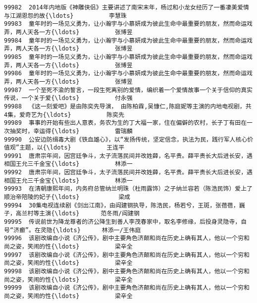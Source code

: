 \documentclass[11pt]{article}
\begin{document}
\begin{Verbatim}[commandchars=\\\{\}]
99982  2014年内地版《神雕侠侣》主要讲述了南宋末年，杨过和小龙女经历了一番凄美爱情与江湖恩怨的故{\ldots}          李慧珠   
99983  童年时的一场见义勇为，让小瀚宇与小慕妍成为彼此生命中最重要的朋友，然而命运戏弄，两人天各一方{\ldots}          张博昱   
99984  童年时的一场见义勇为，让小瀚宇与小慕妍成为彼此生命中最重要的朋友，然而命运戏弄，两人天各一方{\ldots}          张博昱   
99985  童年时的一场见义勇为，让小瀚宇与小慕妍成为彼此生命中最重要的朋友，然而命运戏弄，两人天各一方{\ldots}          张博昱   
99986  童年时的一场见义勇为，让小瀚宇与小慕妍成为彼此生命中最重要的朋友，然而命运戏弄，两人天各一方{\ldots}          张博昱   
99987  一个至死不渝的誓言，一段生死离别的爱情，编织着一个爱情故事一个关于信仰的真实传说，一个关于爱{\ldots}          付永强   
99988  《这一刻爱吧》是由陈奕先导演， 由陈柏霖,吴慷仁,陈庭妮等主演的内地电视剧，共4集，爱奇艺为{\ldots}          陈奕先   
99989  事事的开始有些出人意表，务农为生的丁大福一家，住在偏僻的农村，长子丁有田在一次抽奖时，幸运得{\ldots}          雷瑞麟   
99990  公安边防缉毒大剧《铁血雄心》，以“发扬传统，坚定信念，执法为民，践行军人核心价值观”主题，以{\ldots}          王连平   
99991  唐肃宗年间，因宫廷争斗，太子流落民间并改姓薛，名平贵。薛平贵长大后进长安，遇相国王允三千金宝{\ldots}          林添一   
99992  唐肃宗年间，因宫廷争斗，太子流落民间并改姓薛，名平贵。薛平贵长大后进长安，遇相国王允三千金宝{\ldots}          林添一   
99993  在清朝康熙年间，内务府总管纳兰明珠（杜雨露饰）之子纳兰容若（陈浩民饰）爱上了顺治帝陪陵的妃子{\ldots}           梁成   
99994  30集电视连续剧《剑出江南》，由阎建钢执导，陈浩民，杨若兮，王斑，张蓓蓓，巍子，高兰村等主演{\ldots}      范冬雨/阎建钢   
99995  传说前世为降龙尊者的济公降生到善人李茂春家中，取名李修缘，后投身灵隐寺，自号“济癫”。在灵隐{\ldots}      林添一/王伟庭   
99996  该剧改编自小说《济公传》，剧中主要角色济颠和尚在历史上确有其人，他以一个穷和尚之姿，笑闹的性{\ldots}          梁辛全   
99997  该剧改编自小说《济公传》，剧中主要角色济颠和尚在历史上确有其人，他以一个穷和尚之姿，笑闹的性{\ldots}          梁辛全   
99998  该剧改编自小说《济公传》，剧中主要角色济颠和尚在历史上确有其人，他以一个穷和尚之姿，笑闹的性{\ldots}          梁辛全   
99999  该剧改编自小说《济公传》，剧中主要角色济颠和尚在历史上确有其人，他以一个穷和尚之姿，笑闹的性{\ldots}          梁辛全   


\end{Verbatim}
\end{document}
